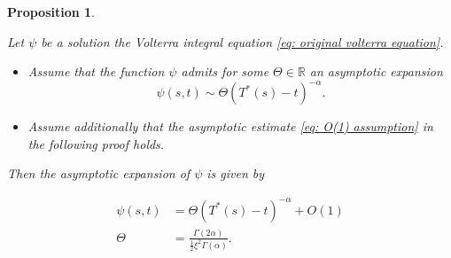 \documentclass[12pt,twoside]{article}
\theoremstyle{plain}
\theoremstyle{plain}
\newtheorem{proposition}{Proposition}[section]
\theoremstyle{definition}
\theoremstyle{remark}
\numberwithin{equation}{section}
\begin{document}
\begin{proposition}
\label{prop: blow-up behavior of the volterra integral equation}

Let $\psi$ be a solution the Volterra integral equation \eqref{eq: original volterra equation}.

\begin{itemize}
    \item Assume that the function $\psi$ admits for some $\Theta \in \mathbb R$ an asymptotic expansion
    \begin{equation}
    \label{eq: assumption for the asymptotic expansion of psi}
    \psi(s, t) \sim \Theta (T^*(s)-t)^{-\alpha}.
    \end{equation}
    \item
     Assume additionally that the asymptotic estimate \eqref{eq: O(1) assumption} in the following proof holds.
\end{itemize}

Then the asymptotic expansion of $\psi$ is given by

\begin{align}
\label{eq: asymptotic expansion of psi}
\psi(s, t) &= \Theta (T^*(s)-t)^{-\alpha} + O(1) \\[10pt]
\Theta&=\frac{\Gamma(2\alpha)}{\frac 12 \xi^2 \Gamma(\alpha)}. \nonumber
\end{align}

\end{proposition}

\vspace{10pt}
\end{document}
